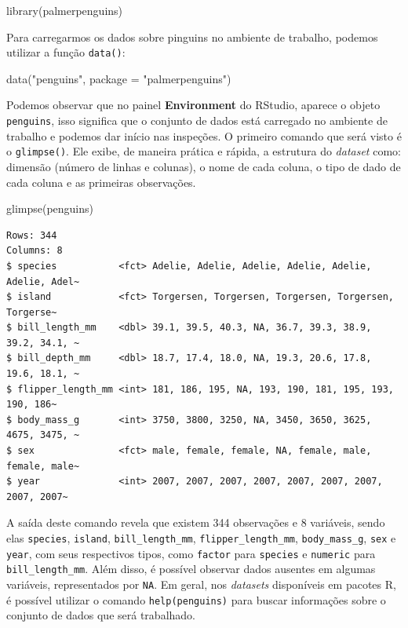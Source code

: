 \documentclass[
  12pt,
  letterpaper,
  DIV=11,
  numbers=noendperiod]{scrreprt}
\newenvironment{Shaded}{\begin{snugshade}}{\end{snugshade}}
\newcommand{\AttributeTok}[1]{\textcolor[rgb]{0.40,0.45,0.13}{#1}}
\newcommand{\FunctionTok}[1]{\textcolor[rgb]{0.28,0.35,0.67}{#1}}
\newcommand{\NormalTok}[1]{\textcolor[rgb]{0.00,0.23,0.31}{#1}}
\newcommand{\StringTok}[1]{\textcolor[rgb]{0.13,0.47,0.30}{#1}}
\theoremstyle{definition}
\theoremstyle{exemplo}
\begin{document}
\begin{Shaded}
\begin{Highlighting}[]
\FunctionTok{library}\NormalTok{(palmerpenguins)}
\end{Highlighting}
\end{Shaded}

\noindent Para carregarmos os dados sobre pinguins no ambiente de
trabalho, podemos utilizar a função \texttt{data()}:

\begin{Shaded}
\begin{Highlighting}[]
\FunctionTok{data}\NormalTok{(}\StringTok{"penguins"}\NormalTok{, }\AttributeTok{package =} \StringTok{"palmerpenguins"}\NormalTok{)}
\end{Highlighting}
\end{Shaded}

Podemos observar que no painel \textbf{Environment} do RStudio, aparece
o objeto \texttt{penguins}, isso significa que o conjunto de dados está
carregado no ambiente de trabalho e podemos dar início nas inspeções. O
primeiro comando que será visto é o \texttt{glimpse()}. Ele exibe, de
maneira prática e rápida, a estrutura do \emph{dataset} como: dimensão
(número de linhas e colunas), o nome de cada coluna, o tipo de dado de
cada coluna e as primeiras observações.

\begin{Shaded}
\begin{Highlighting}[]
\FunctionTok{glimpse}\NormalTok{(penguins)}
\end{Highlighting}
\end{Shaded}

\begin{verbatim}
Rows: 344
Columns: 8
$ species           <fct> Adelie, Adelie, Adelie, Adelie, Adelie, Adelie, Adel~
$ island            <fct> Torgersen, Torgersen, Torgersen, Torgersen, Torgerse~
$ bill_length_mm    <dbl> 39.1, 39.5, 40.3, NA, 36.7, 39.3, 38.9, 39.2, 34.1, ~
$ bill_depth_mm     <dbl> 18.7, 17.4, 18.0, NA, 19.3, 20.6, 17.8, 19.6, 18.1, ~
$ flipper_length_mm <int> 181, 186, 195, NA, 193, 190, 181, 195, 193, 190, 186~
$ body_mass_g       <int> 3750, 3800, 3250, NA, 3450, 3650, 3625, 4675, 3475, ~
$ sex               <fct> male, female, female, NA, female, male, female, male~
$ year              <int> 2007, 2007, 2007, 2007, 2007, 2007, 2007, 2007, 2007~
\end{verbatim}

A saída deste comando revela que existem 344 observações e 8 variáveis,
sendo elas \texttt{species}, \texttt{island}, \texttt{bill\_length\_mm},
\texttt{flipper\_length\_mm}, \texttt{body\_mass\_g}, \texttt{sex} e
\texttt{year}, com seus respectivos tipos, como \texttt{factor} para
\texttt{species} e \texttt{numeric} para \texttt{bill\_length\_mm}. Além
disso, é possível observar dados ausentes em algumas variáveis,
representados por \texttt{NA}. Em geral, nos \emph{datasets} disponíveis
em pacotes R, é possível utilizar o comando \texttt{help(penguins)} para
buscar informações sobre o conjunto de dados que será trabalhado.
\end{document}
